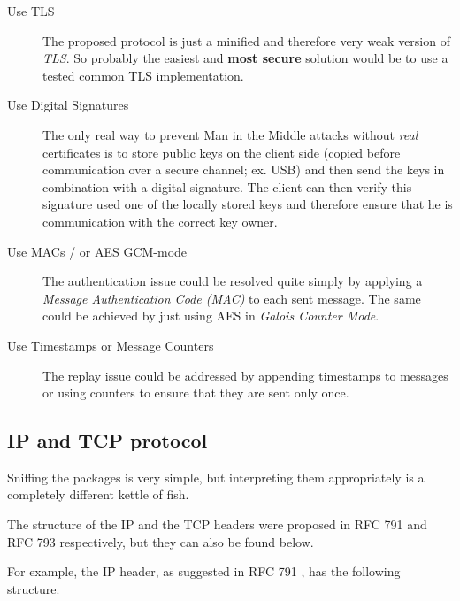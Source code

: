 \documentclass[11pt, a4paper]{article}
\begin{document}
\begin{description}
	
	\item[Use TLS] The proposed protocol is just a minified and therefore very
	weak version of \textit{TLS}. So probably the easiest and \textbf{most
		secure} solution would be to use a tested common TLS implementation.
	
	\item[Use Digital Signatures] The only real way to prevent Man in the Middle
	attacks without \textit{real} certificates is to store public keys on the
	client side (copied before communication over a secure channel; ex. USB) and
	then send the keys in combination with a digital signature. The client can
	then verify this signature used one of the locally stored keys and therefore
	ensure that he is communication with the correct key owner.
	
	\item[Use MACs / or AES GCM-mode] The authentication issue could be resolved
	quite simply by applying a \textit{Message Authentication Code (MAC)} to
	each sent message. The same could be achieved by just using AES in
	\textit{Galois Counter Mode}.
	
	\item[Use Timestamps or Message Counters] The replay issue could be
	addressed by appending timestamps to messages or using counters to ensure
	that they are sent only once.
	
\end{description}

\subsection{IP and TCP protocol}
\label{subsec:iptcp}
Sniffing the packages is very simple, but interpreting them
appropriately is a completely different kettle of fish. 

The structure of the IP and the TCP headers were proposed in RFC 791
and RFC 793 respectively, but they can also be found below. 

For example, the IP header, as suggested in RFC 791 \cite{rfc791}, has
the following structure. 
\end{document}

